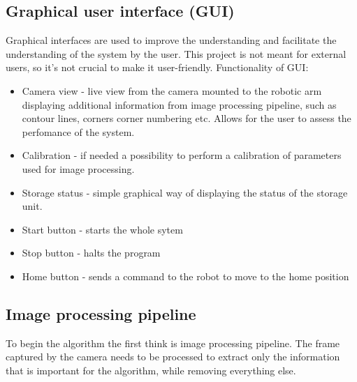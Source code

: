 \subsection{Graphical user interface (GUI)}
Graphical interfaces are used to improve the understanding and facilitate the understanding
of the system by the user. This project is not meant for external users, so it's not
crucial to make it user-friendly. 
Functionality of GUI:
\begin{itemize}
    \item Camera view - live view from the camera mounted to the robotic arm displaying
    additional information from image processing pipeline, such as contour lines, corners
    corner numbering etc. Allows for the user to assess the perfomance of the system.
    \item Calibration - if needed a possibility to perform a calibration of parameters
    used for image processing. 
    \item Storage status - simple graphical way of displaying the status of the storage unit.
    \item Start button - starts the whole sytem
    \item Stop button - halts the program
    \item Home button - sends a command to the robot to move to the home position
\end{itemize}


\subsection{Image processing pipeline}
To begin the algorithm the first think is image processing pipeline.
The frame captured by the camera needs to be processed to extract
only the information that is important for the algorithm,
while removing everything else.


